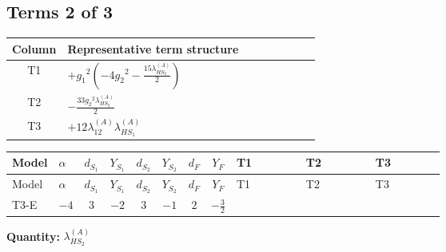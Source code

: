 \documentclass[8pt]{article}
\begin{document}
\begin{landscape}
\subsection*{Terms 2 of 3}
\begin{center}
\begin{tabular}{@{}c >{\raggedright\arraybackslash}p{0.82\linewidth}@{}}
\toprule
Column & Representative term structure \\
\midrule
T1 & \(\displaystyle +{g_1}^2 \left(-4 {g_2}^2-\frac{15 {\lambda_{HS_2}^{(A)}}}{2}\right)\) \\
\midrule
T2 & \(\displaystyle -\frac{33 {g_2}^2 {\lambda_{HS_2}^{(A)}}}{2}\) \\
\midrule
T3 & \(\displaystyle +12 {\lambda_{12}^{(A)}} {\lambda_{HS_1}^{(A)}}\) \\
\midrule
\bottomrule
\end{tabular}
\end{center}
\smallskip
\tiny
\begin{longtable}{@{}llcccccc >{\raggedright\arraybackslash}p{0.21\linewidth} >{\raggedright\arraybackslash}p{0.21\linewidth} >{\raggedright\arraybackslash}p{0.21\linewidth}@{}}
\toprule
Model & $\alpha$ & $d_{S_1}$ & $Y_{S_1}$ & $d_{S_2}$ & $Y_{S_2}$ & $d_F$ & $Y_F$ & T1 & T2 & T3 \\
\midrule
\endfirsthead
\toprule
Model & $\alpha$ & $d_{S_1}$ & $Y_{S_1}$ & $d_{S_2}$ & $Y_{S_2}$ & $d_F$ & $Y_F$ & T1 & T2 & T3 \\
\midrule
\endhead
T3-E & $-4$ & $3$ & $-2$ & $3$ & $-1$ & $2$ & $-\frac{3}{2}$ & \scriptsize\adjustbox{max width=\linewidth}{$\begin{gathered} +{g_1}^2 \left(-4 {g_2}^2-\frac{15 {\lambda_{HS_2}^{(A)}}}{2}\right)\end{gathered}$} & \scriptsize\adjustbox{max width=\linewidth}{$\begin{gathered} -\frac{33 {g_2}^2 {\lambda_{HS_2}^{(A)}}}{2}\end{gathered}$} & \scriptsize\adjustbox{max width=\linewidth}{$\begin{gathered} +12 {\lambda_{12}^{(A)}} {\lambda_{HS_1}^{(A)}}\end{gathered}$} \\
\midrule
\bottomrule
\end{longtable}
\clearpage
\noindent\textbf{Quantity: }$\lambda_{HS_2}^{(A)}$\par\smallskip

\end{landscape}
\end{document}
